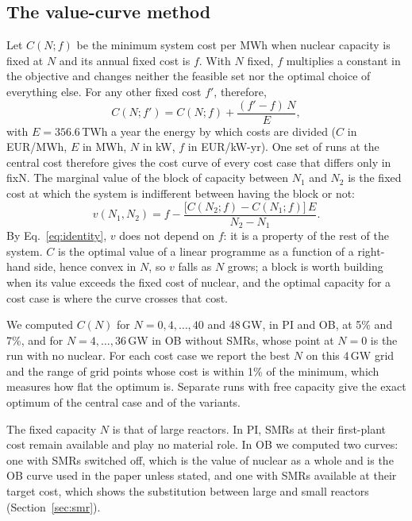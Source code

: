 \subsection{The value-curve method}\label{sec:method}
Let $C(N;f)$ be the minimum system cost per MWh when nuclear capacity is fixed at $N$ and its annual fixed cost is $f$. With $N$ fixed, $f$ multiplies a constant in the objective and changes neither the feasible set nor the optimal choice of everything else. For any other fixed cost $f'$, therefore,
\begin{equation}
C(N;f')=C(N;f)+\frac{(f'-f)\,N}{E},\label{eq:identity}
\end{equation}
with $E=356.6$\,TWh a year the energy by which costs are divided ($C$ in EUR/MWh, $E$ in MWh, $N$ in kW, $f$ in EUR/kW-yr). One set of runs at the central cost therefore gives the cost curve of every cost case that differs only in fixN. The marginal value of the block of capacity between $N_1$ and $N_2$ is the fixed cost at which the system is indifferent between having the block or not:
\begin{equation}
v(N_1,N_2)=f-\frac{\big[C(N_2;f)-C(N_1;f)\big]\,E}{N_2-N_1}.\label{eq:value}
\end{equation}
By Eq.~\eqref{eq:identity}, $v$ does not depend on $f$: it is a property of the rest of the system. $C$ is the optimal value of a linear programme as a function of a right-hand side, hence convex in $N$, so $v$ falls as $N$ grows; a block is worth building when its value exceeds the fixed cost of nuclear, and the optimal capacity for a cost case is where the curve crosses that cost.

We computed $C(N)$ for $N=0,4,\dots,40$ and 48\,GW, in PI and OB, at 5\% and 7\%, and for $N=4,\dots,36$\,GW in OB without SMRs, whose point at $N=0$ is the run with no nuclear. For each cost case we report the best $N$ on this 4\,GW grid and the range of grid points whose cost is within 1\% of the minimum, which measures how flat the optimum is. Separate runs with free capacity give the exact optimum of the central case and of the variants.

The fixed capacity $N$ is that of large reactors. In PI, SMRs at their first-plant cost remain available and play no material role. In OB we computed two curves: one with SMRs switched off, which is the value of nuclear as a whole and is the OB curve used in the paper unless stated, and one with SMRs available at their target cost, which shows the substitution between large and small reactors (Section~\ref{sec:smr}).

